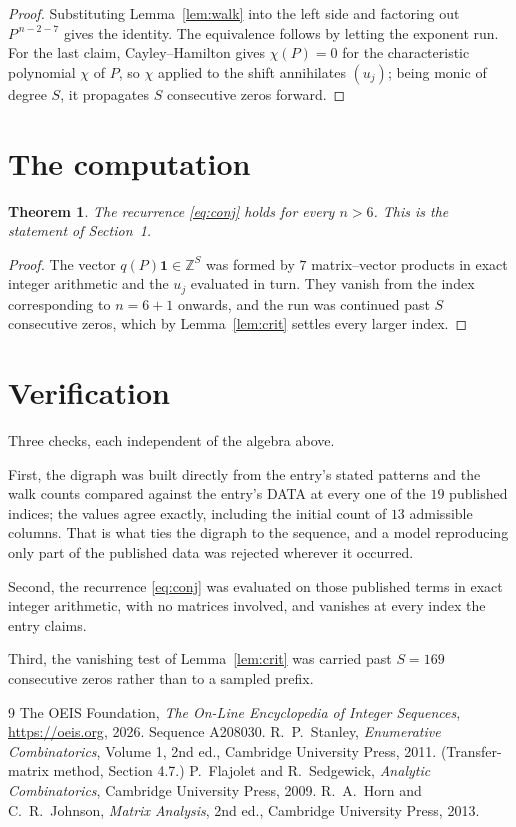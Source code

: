 \documentclass[11pt,a4paper]{article}
\theoremstyle{plain}
\newtheorem{theorem}{Theorem}
\theoremstyle{definition}
\begin{document}
\begin{proof}
Substituting Lemma~\ref{lem:walk} into the left side and factoring out
$P^{\,n-2-7}$ gives the identity. The equivalence follows by letting the exponent
run. For the last claim, Cayley--Hamilton gives $\chi(P)=0$ for the characteristic
polynomial $\chi$ of $P$, so $\chi$ applied to the shift annihilates $(u_j)$; being monic of
degree $S$, it propagates $S$ consecutive zeros forward.
\end{proof}

\section{The computation}

\begin{theorem}
The recurrence \eqref{eq:conj} holds for every $n>6$. This is the statement of
Section~1.
\end{theorem}

\begin{proof}
The vector $q(P)\mathbf{1}\in\mathbb{Z}^{S}$ was formed by $7$ matrix--vector
products in exact integer arithmetic and the $u_j$ evaluated in turn. They vanish from the
index corresponding to $n=6+1$ onwards, and the run was continued past $S$ consecutive
zeros, which by Lemma~\ref{lem:crit} settles every larger index.
\end{proof}

\section{Verification}

Three checks, each independent of the algebra above.

First, the digraph was built directly from the entry's stated patterns and the walk counts
compared against the entry's DATA at every one of the $19$ published indices; the
values agree exactly, including the initial count of $13$ admissible columns. That is
what ties the digraph to the sequence, and a model reproducing only part of the published
data was rejected wherever it occurred.

Second, the recurrence \eqref{eq:conj} was evaluated on those published terms in exact
integer arithmetic, with no matrices involved, and vanishes at every index the entry claims.

Third, the vanishing test of Lemma~\ref{lem:crit} was carried past $S=169$ consecutive
zeros rather than to a sampled prefix.

\begin{thebibliography}{9}
 The OEIS Foundation, \emph{The On-Line Encyclopedia of Integer
Sequences}, \url{https://oeis.org}, 2026. Sequence A208030.
 R.~P.~Stanley, \emph{Enumerative Combinatorics}, Volume 1, 2nd ed.,
Cambridge University Press, 2011. (Transfer-matrix method, Section 4.7.)
 P.~Flajolet and R.~Sedgewick, \emph{Analytic Combinatorics}, Cambridge
University Press, 2009.
 R.~A.~Horn and C.~R.~Johnson, \emph{Matrix Analysis}, 2nd ed., Cambridge
University Press, 2013.
\end{thebibliography}
\end{document}
